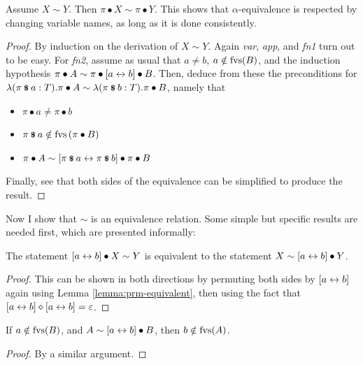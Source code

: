 \begin{lemma}
\label{lemma:prm-equivalent}
Assume \(X \sim Y\).
Then \(\pi \bullet X \sim \pi \bullet Y\).
This shows that \(\alpha\)-equivalence is respected by changing variable names, as long as it is done consistently.
\end{lemma}
\begin{proof}
By induction on the derivation of \(X \sim Y\).
Again \emph{var}, \emph{app}, and \emph{fn1} turn out to be easy.
For \emph{fn2}, assume as usual that \(a \neq b\), \(a \notin \mathrm{fvs}(B)\), and the induction hypothesis \(\pi \bullet A \sim \pi \bullet [a \leftrightarrow b] \bullet B\).
Then, deduce from these the preconditions for \(\lambda (\pi \mathbin{\textrm{\footnotesize{\textbf{\$}}}} a:T). \pi \bullet A \sim \lambda (\pi \mathbin{\textrm{\footnotesize{\textbf{\$}}}} b:T). \pi \bullet B\), namely that
\begin{itemize}
\item
\(\pi \bullet a \neq \pi \bullet b\)
\item
\(\pi \mathbin{\textrm{\footnotesize{\textbf{\$}}}} a \notin \mathrm{fvs}\left(\pi \bullet B\right)\)
\item
\(\pi \bullet A \sim [\pi \mathbin{\textrm{\footnotesize{\textbf{\$}}}} a \leftrightarrow \pi \mathbin{\textrm{\footnotesize{\textbf{\$}}}} b] \bullet \pi \bullet B\)
\end{itemize}
Finally, see that both sides of the equivalence can be simplified to produce the result.
\end{proof}

Now I show that \(\sim\) is an equivalence relation.
Some simple but specific results are needed first, which are presented informally:

\begin{lemma}
\label{lemma:transfer-swapping}
The statement \([a \leftrightarrow b] \bullet X \sim Y\) is equivalent to the statement \(X \sim [a \leftrightarrow b] \bullet Y\).
\end{lemma}
\begin{proof}
This can be shown in both directions by permuting both sides by \([a \leftrightarrow b]\) again using Lemma \ref{lemma:prm-equivalent}, then using the fact that \([a \leftrightarrow b] \diamond [a \leftrightarrow b] = \varepsilon\).
\end{proof}

\begin{lemma}
\label{lemma:transfer-freshness}
If \(a \notin \mathrm{fvs}(B)\), and \(A \sim [a \leftrightarrow b] \bullet B\), then \(b \notin \mathrm{fvs}(A)\).
\end{lemma}
\begin{proof}
By a similar argument.
\end{proof}

